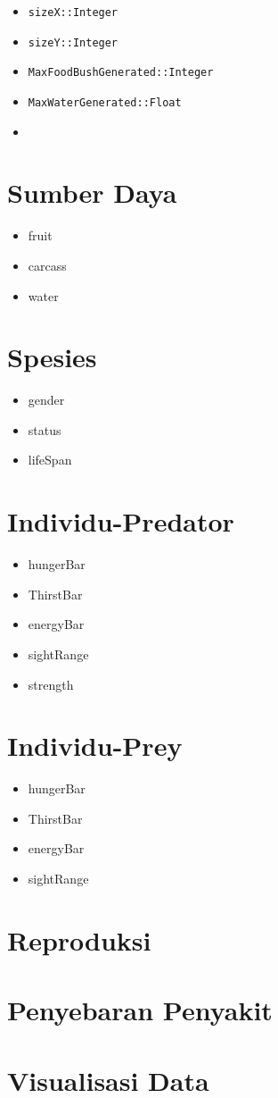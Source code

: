 \documentclass[12pt]{article}
\begin{document}
\begin{itemize}
    \item \texttt{sizeX::Integer}
    \item \texttt{sizeY::Integer}
    \item \texttt{MaxFoodBushGenerated::Integer}
    \item \texttt{MaxWaterGenerated::Float}
    \item 
\end{itemize}
\section{Sumber Daya}
\begin{itemize}
    \item fruit
    \item carcass
    \item water
\end{itemize}
\section{Spesies}
\begin{itemize}
    \item gender
    \item status 
    \item lifeSpan
\end{itemize}
\section{Individu-Predator}
\begin{itemize}
    \item hungerBar
    \item ThirstBar
    \item energyBar
    \item sightRange
    \item strength
\end{itemize}
\section{Individu-Prey}
\begin{itemize}
    \item hungerBar
    \item ThirstBar
    \item energyBar
    \item sightRange
\end{itemize}
\section{Reproduksi}
\section{Penyebaran Penyakit}
\section{Visualisasi Data}


 
\end{document}
